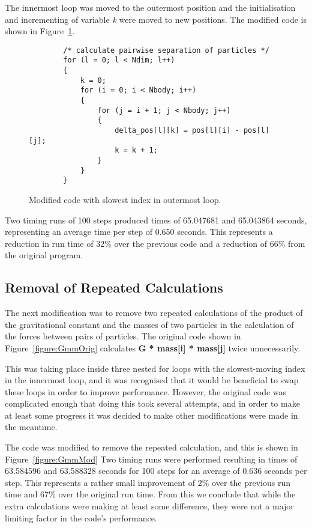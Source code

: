 \documentclass[11pt, oneside]{article}   %
\begin{document}
The innermost loop was moved to the outermost position and the initialisation and incrementing of variable {\em k} were moved to new positions.
The modified code is shown in Figure~\ref{figure:PairSepMod}.

\begin{figure}
	\begin{lstlisting}
		/* calculate pairwise separation of particles */
		for (l = 0; l < Ndim; l++)
		{
			k = 0;
			for (i = 0; i < Nbody; i++)
			{
				for (j = i + 1; j < Nbody; j++)
				{
					delta_pos[l][k] = pos[l][i] - pos[l][j];
					k = k + 1;
				}
			}
		}
	\end{lstlisting}
	\caption{Modified code with slowest index in outermost loop.}
	\label{figure:PairSepMod}
\end{figure}

Two timing runs of 100 steps produced times of 65.047681 and 65.043864 seconds, representing an average time per step of 0.650 seconds.
This represents a reduction in run time of 32\% over the previous code and a reduction of 66\% from the original program.

\subsection{Removal of Repeated Calculations}
The next modification was to remove two repeated calculations of the product of the gravitational constant and the masses of two particles in the calculation of the forces between pairs of particles.
The original code shown in Figure~\ref{figure:GmmOrig} calculates \textbf{G * mass[i] * mass[j]} twice unnecessarily.

This was taking place inside three nested for loops with the slowest-moving index in the innermost loop, and it was recognised that it would be beneficial to swap these loops in order to improve performance.
However, the original code was complicated enough that doing this took several attempts, and in order to make at least some progress it was decided to make other modifications were made in the meantime.

The code was modified to remove the repeated calculation, and this is shown in Figure~\ref{figure:GmmMod}
Two timing runs were performed resulting in times of 63.584596 and 63.588328 seconds for 100 steps for an average of 0.636 seconds per step.
This represents a rather small improvement of 2\% over the previous run time and 67\% over the original run time.
From this we conclude that while the extra calculations were making at least some difference, they were not a major limiting factor in the code's performance.
\end{document}
